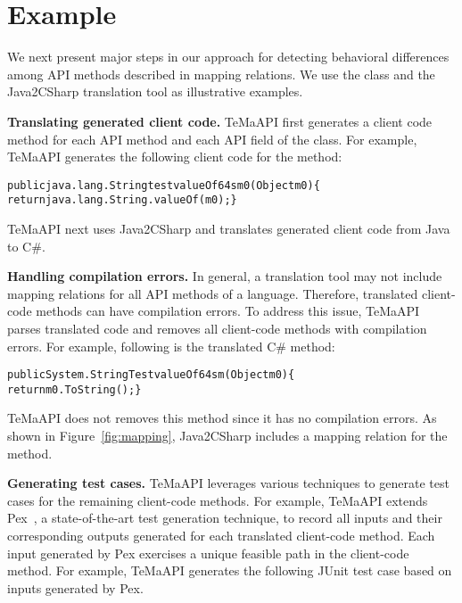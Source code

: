 \section{Example}
\label{sec:example}

We next present major steps in our approach for detecting behavioral differences among API methods described in mapping relations. We use the  class and the Java2CSharp translation tool as illustrative examples.

\textbf{Translating generated client code.} TeMaAPI first generates a client code method for each API method and each API field of the  class. For example, TeMaAPI generates the following client code for the  method:

\begin{CodeOut}%
\begin{alltt}
  public java.lang.String testvalueOf64sm0(Object m0) \{
    return java.lang.String.valueOf(m0); \}
\end{alltt}
\end{CodeOut}

TeMaAPI next uses Java2CSharp and translates generated client code from Java to C\#.

\textbf{Handling compilation errors.} In general, a translation tool may not include mapping relations for all API methods of a language. Therefore, translated client-code methods can have compilation errors. To address this issue, TeMaAPI parses translated code and removes all client-code methods with compilation errors. For example, following is the translated C\#  method:

\begin{CodeOut}%
\begin{alltt}
  public System.String TestvalueOf64sm(Object m0) \{
    return m0.ToString();\}
\end{alltt}
\end{CodeOut}

TeMaAPI does not removes this method since it has no compilation errors. As shown in Figure~\ref{fig:mapping}, Java2CSharp includes a mapping relation for the  method.

\textbf{Generating test cases.} TeMaAPI leverages various techniques to generate test cases for the remaining client-code methods. For example, TeMaAPI extends Pex~\cite{tillmann2008pex}, a state-of-the-art test generation technique, to record all inputs and their corresponding outputs generated for each translated client-code method. Each input generated by Pex exercises a unique feasible path in the client-code method. For example, TeMaAPI generates the following JUnit test case based on inputs generated by Pex.

